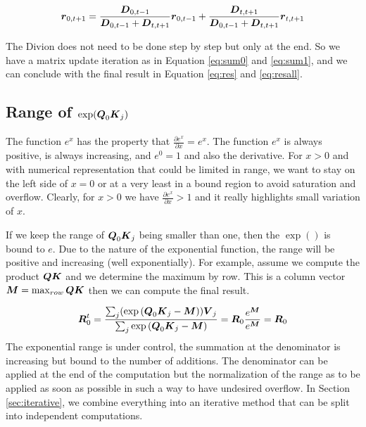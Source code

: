 \documentclass[conference]{IEEEtran}
\begin{document}
\begin{equation*}
  {\boldsymbol r}_{0,t+1} = \frac{{\boldsymbol D}_{0,t-1}}{{\boldsymbol D}_{0,t-1} + {\boldsymbol D}_{t,t+1}}{\boldsymbol r}_{0,t-1}  +  \frac{{\boldsymbol D}_{t,t+1}}{{\boldsymbol D}_{0,t-1} + {\boldsymbol D}_{t,t+1}}{\boldsymbol r}_{t,t+1} 
\end{equation*}

The Divion does not need to be done step by step but only at the
end. So we have a matrix update iteration as in Equation \ref{eq:sum0}
and \ref{eq:sum1}, and we can conclude with the final result in
Equation \ref{eq:res} and \ref{eq:resall}.



\subsection{Range of $\exp({\boldsymbol Q}_0{\boldsymbol K}_j)$}
\label{sec:range}
The function $e^x$ has the property that $\frac{\partial e^x}{\partial
  x}= e^x$. The function $e^x$ is always positive, is always
increasing, and $e^0=1$ and also the derivative. For $x>0$ and with
numerical representation that could be limited in range, we want to
stay on the left side of $x=0$ or at a very least in a bound region to
avoid saturation and overflow. Clearly, for $x>0$ we have
$\frac{\partial e^x}{\partial x}>1$ and it really highlights small
variation of $x$.

If we keep the range of ${\boldsymbol Q}_0{\boldsymbol K}_j$ being smaller than one,
then the $\exp()$ is bound to $e$. Due to the nature of the
exponential function, the range will be positive and increasing (well
exponentially). For example, assume we compute the product
${\boldsymbol Q}{\boldsymbol K}$ and we determine the maximum by row. This is a column
vector ${\boldsymbol M} = \max_{row} {\boldsymbol Q}{\boldsymbol K}$ then we can compute the
final result. 

\begin{equation}
  \label{eq:c}
  \Vc{R}_0^t = \frac{\sum_j(\exp{(\Vc{Q}_0\Vc{K}_j-\Vc{M})})\Vc{V}_j}{\sum_j\exp{(\Vc{Q}_0\Vc{K}_j-\Vc{M})}} =
     \Vc{R}_0\frac{e^{\Vc{M}}}{e^{\Vc{M}}}= \Vc{R}_0
\end{equation}
The exponential range is under control, the summation at the
denominator is increasing but bound to the number of additions.  The
denominator can be applied at the end of the computation but the
normalization of the range as to be applied as soon as possible in
such a way to have undesired overflow. In Section \ref{sec:iterative}, we combine
everything into an iterative method that can be split into independent
computations.
\end{document}
